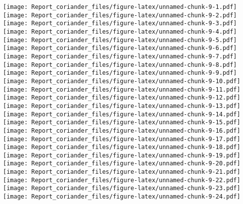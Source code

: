 \documentclass[]{article}
\begin{document}
\texttt{[image: Report\_coriander\_files/figure-latex/unnamed-chunk-9-1.pdf]}
\texttt{[image: Report\_coriander\_files/figure-latex/unnamed-chunk-9-2.pdf]}
\texttt{[image: Report\_coriander\_files/figure-latex/unnamed-chunk-9-3.pdf]}
\texttt{[image: Report\_coriander\_files/figure-latex/unnamed-chunk-9-4.pdf]}
\texttt{[image: Report\_coriander\_files/figure-latex/unnamed-chunk-9-5.pdf]}
\texttt{[image: Report\_coriander\_files/figure-latex/unnamed-chunk-9-6.pdf]}
\texttt{[image: Report\_coriander\_files/figure-latex/unnamed-chunk-9-7.pdf]}
\texttt{[image: Report\_coriander\_files/figure-latex/unnamed-chunk-9-8.pdf]}
\texttt{[image: Report\_coriander\_files/figure-latex/unnamed-chunk-9-9.pdf]}
\texttt{[image: Report\_coriander\_files/figure-latex/unnamed-chunk-9-10.pdf]}
\texttt{[image: Report\_coriander\_files/figure-latex/unnamed-chunk-9-11.pdf]}
\texttt{[image: Report\_coriander\_files/figure-latex/unnamed-chunk-9-12.pdf]}
\texttt{[image: Report\_coriander\_files/figure-latex/unnamed-chunk-9-13.pdf]}
\texttt{[image: Report\_coriander\_files/figure-latex/unnamed-chunk-9-14.pdf]}
\texttt{[image: Report\_coriander\_files/figure-latex/unnamed-chunk-9-15.pdf]}
\texttt{[image: Report\_coriander\_files/figure-latex/unnamed-chunk-9-16.pdf]}
\texttt{[image: Report\_coriander\_files/figure-latex/unnamed-chunk-9-17.pdf]}
\texttt{[image: Report\_coriander\_files/figure-latex/unnamed-chunk-9-18.pdf]}
\texttt{[image: Report\_coriander\_files/figure-latex/unnamed-chunk-9-19.pdf]}
\texttt{[image: Report\_coriander\_files/figure-latex/unnamed-chunk-9-20.pdf]}
\texttt{[image: Report\_coriander\_files/figure-latex/unnamed-chunk-9-21.pdf]}
\texttt{[image: Report\_coriander\_files/figure-latex/unnamed-chunk-9-22.pdf]}
\texttt{[image: Report\_coriander\_files/figure-latex/unnamed-chunk-9-23.pdf]}
\texttt{[image: Report\_coriander\_files/figure-latex/unnamed-chunk-9-24.pdf]}
\end{document}

